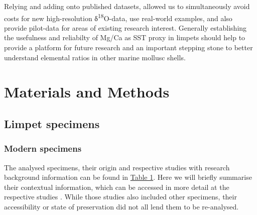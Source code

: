 \documentclass[
  authoryear,
  preprint,
  3p]{elsarticle}
\begin{document}
Relying and adding onto published datasets, allowed us to simultaneously
avoid costs for new high-resolution δ\textsuperscript{18}O-data, use
real-world examples, and also provide pilot-data for areas of existing
research interest. Generally establishing the usefulness and reliabilty
of Mg/Ca as SST proxy in limpets should help to provide a platform for
future research and an important stepping stone to better understand
elemental ratios in other marine mollusc shells.

\section{Materials and Methods}\label{Methods}

\subsection{Limpet specimens}\label{limpet-specimens}

\subsubsection{Modern specimens}\label{modern-specimens}

The analysed specimens, their origin and respective studies with
research background information can be found in \hyperref[Table_1]{Table
1}. Here we will briefly summarise their contextual information, which
can be accessed in more detail at the respective studies
\citep{Nicastro2020-ih, Surge2012-ba, Graniero2017-io}. While those
studies also included other specimens, their accessibility or state of
preservation did not all lend them to be re-analysed.
\end{document}
